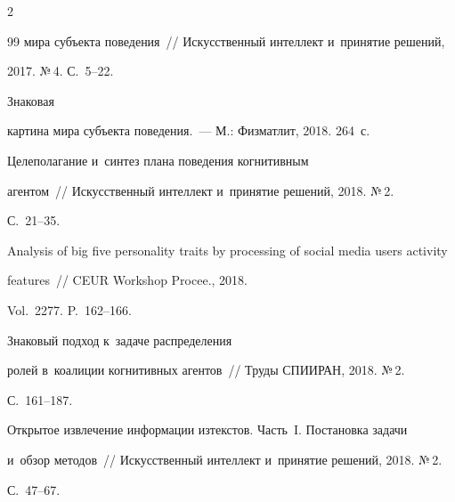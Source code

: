 \begin{multicols}{2}
{{\begin{thebibliography}{99}
мира субъекта поведения~// Искусственный интеллект и~принятие решений, 


2017. №\,4. С.~5--22.







   Знаковая 


картина мира субъекта поведения.~--- М.: Физматлит, 2018. 264~с.







   Целеполагание и~синтез плана поведения когнитивным 


агентом~// Искусственный интеллект и~принятие решений, 2018. №\,2.  


С.~21--35.






Analysis of big five personality traits by processing of social media users activity 


features~// CEUR Workshop Procee., 2018.  






Vol.~2277. P.~162--166.




   Знаковый подход к~задаче распределения 


ролей в~коалиции когнитивных агентов~// Труды СПИИРАН, 2018. №\,2. 


С.~161--187.






Открытое извлечение информации из\linebreak текс\-тов. Часть~I. Постановка задачи 


и~обзор методов~// Искусственный интеллект и~принятие решений, 2018. №\,2. 


С.~47--67.







\end{thebibliography}}}
\end{multicols}
